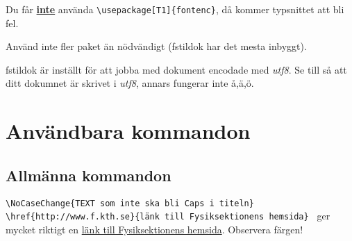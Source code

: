 \documentclass{fstildok}
\newcommand{\bs}{\textbackslash}
\begin{document}
Du får \textbf{\underline{inte}} använda \texttt{\bs usepackage[T1]\{fontenc\}}, då kommer typsnittet att bli fel.

Använd inte fler paket än nödvändigt (fstildok har det mesta inbyggt).

fstildok är inställt för att jobba med dokument encodade med \textit{utf8}. Se till så att ditt dokumnet är skrivet i \textit{utf8}, annars fungerar inte å,ä,ö.

\section{Användbara kommandon}

\subsection{Allmänna kommandon}
\begin{punkter}
\punkt \texttt{\bs NoCaseChange\{TEXT som inte ska bli Caps i titeln\} }
\punkt \texttt{\bs href\{http://www.f.kth.se\}\{länk till Fysiksektionens hemsida\} } ger mycket riktigt en  \href{http://www.f.kth.se}{länk till Fysiksektionens hemsida}. Observera färgen!
\end{punkter}
\end{document}
